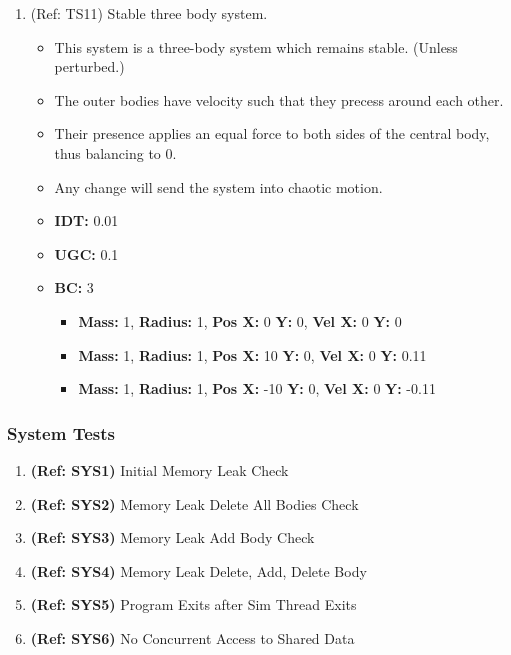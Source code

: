 \begin{enumerate}
\vspace{12pt}  
\item (Ref: TS11) Stable three body system.
  \begin{itemize}
  \item This system is a three-body system which remains stable. (Unless perturbed.)
  \item The outer bodies have velocity such that they precess around each other.
  \item Their presence applies an equal force to both sides of the central body, thus balancing to 0.
  \item Any change will send the system into chaotic motion.
  \item \textbf{IDT:} 0.01
  \item \textbf{UGC:} 0.1 
  \item \textbf{BC:} 3
    \begin{itemize}
    \item \textbf{Mass:} 1, \textbf{Radius:} 1, \textbf{Pos X:} 0 \textbf{Y:} 0, \textbf{Vel X:} 0 \textbf{Y:} 0
    \item \textbf{Mass:} 1, \textbf{Radius:} 1, \textbf{Pos X:} 10 \textbf{Y:} 0, \textbf{Vel X:} 0 \textbf{Y:} 0.11
    \item \textbf{Mass:} 1, \textbf{Radius:} 1, \textbf{Pos X:} -10 \textbf{Y:} 0, \textbf{Vel X:} 0 \textbf{Y:} -0.11
    \end{itemize}
  \end{itemize}
\end{enumerate}

\pagebreak
\subsubsection{System Tests}
\vspace{12pt}
\begin{enumerate}
\item \textbf{(Ref: SYS1)} Initial Memory Leak Check
\item \textbf{(Ref: SYS2)} Memory Leak Delete All Bodies Check
\item \textbf{(Ref: SYS3)} Memory Leak Add Body Check
\item \textbf{(Ref: SYS4)} Memory Leak Delete, Add, Delete Body
\item \textbf{(Ref: SYS5)} Program Exits after Sim Thread Exits
\item \textbf{(Ref: SYS6)} No Concurrent Access to Shared Data
\end{enumerate}

